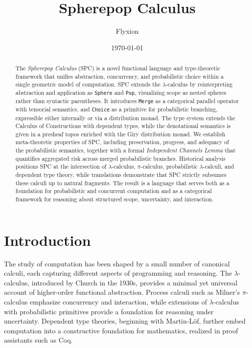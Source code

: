 \documentclass{article}
\title{Spherepop Calculus}
\author{Flyxion}
\date{\today}
\begin{document}
\maketitle

\begin{abstract}
The \emph{Spherepop Calculus} (SPC) is a novel functional language and
type-theoretic framework that unifies abstraction, concurrency, and probabilistic
choice within a single geometric model of computation. SPC extends the
$\lambda$-calculus by reinterpreting abstraction and application as
\texttt{Sphere} and \texttt{Pop}, visualizing scope as nested spheres rather
than syntactic parentheses. It introduces \texttt{Merge} as a categorical
parallel operator with tensorial semantics, and \texttt{Choice} as a primitive
for probabilistic branching, expressible either internally or via a distribution
monad. The type system extends the Calculus of Constructions with dependent
types, while the denotational semantics is given in a presheaf topos enriched
with the Giry distribution monad. We establish meta-theoretic properties of SPC,
including preservation, progress, and adequacy of the probabilistic semantics,
together with a formal \emph{Independent Channels Lemma} that quantifies
aggregated risk across merged probabilistic branches. Historical analysis
positions SPC at the intersection of $\lambda$-calculus, $\pi$-calculus,
probabilistic $\lambda$-calculi, and dependent type theory, while translations
demonstrate that SPC strictly subsumes these calculi up to natural fragments.
The result is a language that serves both as a foundation for probabilistic and
concurrent computation and as a categorical framework for reasoning about
structured scope, uncertainty, and interaction.
\end{abstract}

\tableofcontents

\section{Introduction}

The study of computation has been shaped by a small number of canonical calculi,
each capturing different aspects of programming and reasoning. The
$\lambda$-calculus, introduced by Church in the 1930s, provides a minimal yet
universal account of higher-order functional abstraction. Process calculi such as
Milner’s $\pi$-calculus emphasize concurrency and interaction, while extensions
of $\lambda$-calculus with probabilistic primitives provide a foundation for
reasoning under uncertainty. Dependent type theories, beginning with Martin-Löf,
further embed computation into a constructive foundation for mathematics,
realized in proof assistants such as Coq.
\end{document}
